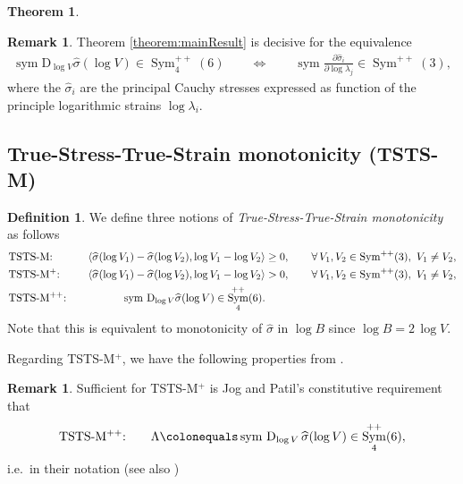 \documentclass[10pt]{article}
\newcounter{theoremCounter}
\numberwithin{theoremCounter}{section}
\theoremstyle{plain}
\newtheorem{thm}[theoremCounter]{Theorem}
\theoremstyle{definition}
\newtheorem{definition}[theoremCounter]{Definition}
\newtheorem{rem}[theoremCounter]{Remark}
\newcommand{\DD}{\mathrm{D}}
\DeclareMathOperator{\Sym}{Sym}
\DeclareMathOperator{\sym}{sym}
\numberwithin{equation}{section}
\begin{document}
\begin{appendix}
\begin{thm}
\end{thm}
%
\begin{rem} \label{remA5}
Theorem \ref{theorem:mainResult} is decisive for the equivalence
	\begin{align}
	\sym \DD_{\log V} \widehat \sigma(\log V) \in \Sym^{++}_4(6) \qquad \iff \qquad \sym \frac{\partial \widehat \sigma_i}{\partial \log \lambda_j} \in \Sym^{++}(3),
	\end{align}
where the $\widehat \sigma_i$ are the principal Cauchy stresses expressed as function of the principle logarithmic strains $\log \lambda_i$.
\end{rem}
%
\subsection{True-Stress-True-Strain monotonicity (TSTS-M)} \label{appendixtstsm}
%
\begin{definition}
We define three notions of \emph{True-Stress-True-Strain monotonicity} as follows
	\begin{equation}
	\begin{alignedat}{2}
	&\textnormal{TSTS-M:} \qquad &\langle \widehat \sigma(\log V_1)- \widehat \sigma(\log V_2),\log V_1-\log V_2\rangle&\ge 0, \qquad \forall\, V_1, V_2\in {\rm Sym}^{++}(3), \ V_1\neq V_2, \\
	&\textnormal{TSTS-M$^+$:} \qquad &\langle \widehat \sigma(\log V_1)- \widehat \sigma(\log V_2),\log V_1-\log V_2\rangle&> 0, \qquad \forall\, V_1, V_2\in {\rm Sym}^{++}(3), \ V_1\neq V_2, \\
	&\textnormal{TSTS-M$^{++}$:} \qquad & \sym \, \DD_{\log V} \widehat \sigma(\log V) \in \Sym^{++}_4(6). &
	\end{alignedat}
	\end{equation}
Note that this is equivalent to monotonicity of $\widehat \sigma$ in $\log B$ since $\log B=2\, \log V$.
\end{definition}
%
\noindent Regarding TSTS-M$^+$, we have the following properties from \cite{NeffGhibaLankeit}.
%
\begin{rem}\label{remarkmon}
Sufficient for TSTS-M$^+$ is Jog and Patil's \cite{jog2013conditions} constitutive requirement that
	\begin{align}
	\textnormal{TSTS-M$^{++}$:} \qquad \Lambda \colonequals \sym \, \DD_{\log V}\,\widehat \sigma(\log V) \in \Sym^{++}_4(6),
	\end{align}
i.e.~in their notation (see also \cite[Remark 4.1]{NeffGhibaLankeit})
	\begin{align}

\end{align}
\end{rem}
\end{appendix}
\end{document}
